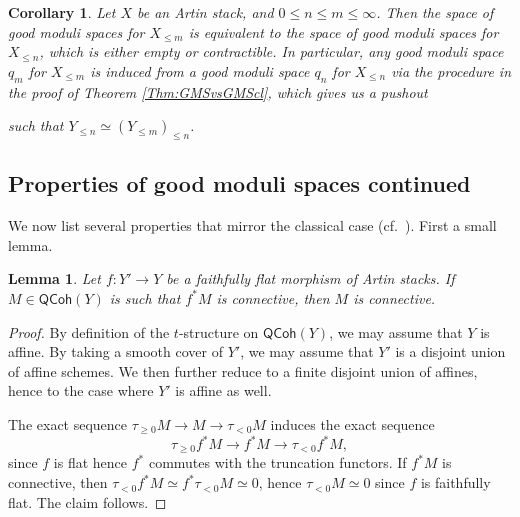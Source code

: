 \documentclass[a4paper,twoside,11pt]{amsart}
\theoremstyle{plain}
\newtheorem{lemma}[theorem]{Lemma}
\newtheorem{corollary}[theorem]{Corollary}
\theoremstyle{definition}
\theoremstyle{remark}
\numberwithin{equation}{section}
\newcommand{\QCoh}{\mathsf{QCoh}}
\begin{document}
\begin{corollary}
\label{Cor:GMS_cl}
    Let $X$ be an Artin stack, and $0 \leq n \leq m \leq \infty$. Then the space of good moduli spaces for $X_{\leq m}$ is equivalent to the space of good moduli spaces for $X_{\leq n}$, which is either empty or contractible. In particular, any good moduli space $q_m$ for $X_{\leq m}$ is induced from a good moduli space $q_n$ for $X_{\leq n}$ via the procedure in the proof of Theorem \ref{Thm:GMSvsGMScl}, which gives us a pushout
    \begin{center}
    \end{center}
    such that $Y_{\leq n} \simeq (Y_{\leq m})_{\leq n}$.
\end{corollary}




\subsection{Properties of good moduli spaces continued}
We now list several properties that mirror the classical case (cf.~\cite[Theorem~4.16]{AlperGood}). First a small lemma.

\begin{lemma}
\label{lem:fpqc_connective}
    Let $f \colon Y' \to Y$ be a faithfully flat morphism of Artin stacks. If $M \in \QCoh(Y)$ is such that $f^*M$ is connective, then $M$ is connective.
\end{lemma}

\begin{proof}
    By definition of the $t$-structure on $\QCoh(Y)$, we may assume that $Y$ is affine. By taking a smooth cover of $Y'$, we may assume that $Y'$ is a disjoint union of affine schemes. We then further reduce to a finite disjoint union of affines, hence to the case where $Y'$ is affine as well.

    The exact sequence $\tau_{\geq 0} M \to M \to \tau_{<0} M$ induces the exact sequence
    \[ \tau_{\geq 0}f^* M \to f^*M \to \tau_{<0} f^*M,  \]
    since $f$ is flat hence $f^*$ commutes with the truncation functors. If $f^*M$ is connective, then $\tau_{<0} f^*M \simeq f^* \tau_{<0} M \simeq 0$, hence $\tau_{<0} M \simeq 0$ since $f$ is faithfully flat. The claim follows.
 \end{proof}
\end{document}
